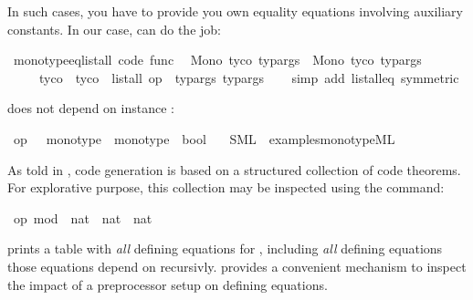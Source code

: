 \begin{isabellebody}
\begin{isamarkuptext}
  In such cases, you have to provide you own equality equations
  involving auxiliary constants.  In our case,
   can do the job:%
\end{isamarkuptext}%
\isamarkuptrue%
\isamarkupfalse%
\ monotype{\isacharunderscore}eq{\isacharunderscore}list{\isacharunderscore}all{}\ {\isacharbrackleft}code\ func{\isacharbrackright}{\isacharcolon}\isanewline
\ \ {\isachardoublequoteopen}Mono\ tyco{}\ typargs{}\ {\isacharequal}\ Mono\ tyco{}\ typargs{}\ {\isasymlongleftrightarrow}\isanewline
\ \ \ \ \ tyco{}\ {\isacharequal}\ tyco{}\ {\isasymand}\ list{\isacharunderscore}all{}\ {\isacharparenleft}op\ {\isacharequal}{\isacharparenright}\ typargs{}\ typargs{}{\isachardoublequoteclose}\isanewline
%
\isadelimproof
\ \ %
\endisadelimproof
%
\isatagproof
{}\isamarkupfalse%
\ {\isacharparenleft}simp\ add{\isacharcolon}\ list{\isacharunderscore}all{}{\isacharunderscore}eq\ {\isacharbrackleft}symmetric{\isacharbrackright}{\isacharparenright}%
\endisatagproof
{\isafoldproof}%
%
\isadelimproof
%
\endisadelimproof
%
\begin{isamarkuptext}%
does not depend on instance :%
\end{isamarkuptext}%
\isamarkuptrue%
\isamarkupfalse%
\ {\isachardoublequoteopen}op\ {\isacharequal}\ {\isacharcolon}{\isacharcolon}\ monotype\ {\isasymRightarrow}\ monotype\ {\isasymRightarrow}\ bool{\isachardoublequoteclose}\isanewline
\ \ \ SML\ \ {\isachardoublequoteopen}examples{\isacharslash}monotype{\isachardot}ML{\isachardoublequoteclose}%
\begin{isamarkuptext}%
%
\end{isamarkuptext}%
\isamarkuptrue%
%
\isamarkuptrue%
%
\begin{isamarkuptext}%
As told in , code generation is based
  on a structured collection of code theorems.
  For explorative purpose, this collection
  may be inspected using the \isa{{\isasymCODETHMS}} command:%
\end{isamarkuptext}%
\isamarkuptrue%
\isamarkupfalse%
\ {\isachardoublequoteopen}op\ mod\ {\isacharcolon}{\isacharcolon}\ nat\ {\isasymRightarrow}\ nat\ {\isasymRightarrow}\ nat{\isachardoublequoteclose}%
\begin{isamarkuptext}%
\noindent prints a table with \emph{all} defining equations
  for , including
  \emph{all} defining equations those equations depend
  on recursivly.  \isa{{\isasymCODETHMS}} provides a convenient
  mechanism to inspect the impact of a preprocessor setup
  on defining equations.
  

\end{isamarkuptext}
\end{isabellebody}
